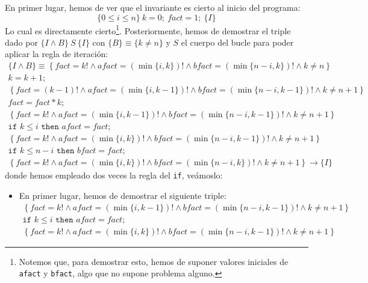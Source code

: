 \begin{ejercicio}
    En primer lugar, hemos de ver que el invariante es cierto al inicio del programa:
    \begin{equation*}
        \{0\leq i\leq n\}\ k=0;\ fact=1;\ \{I\}
    \end{equation*}
    Lo cual es directamente cierto\footnote{Notemos que, para demostrar esto, hemos de suponer valores iniciales de \texttt{afact} y \texttt{bfact}, algo que no supone problema alguno.}. Posteriormente, hemos de demostrar el triple dado por $\{I \land B\}\ S\ \{I\}$ con $\{B\} \equiv \{k \neq n\}$ y $S$ el cuerpo del bucle para poder aplicar la regla de iteración:
    \begin{gather*}
        \{I \land B\} \equiv \left\{fact = k! \land afact = (\min\{i,k\})! \land bfact = (\min\{n-i,k\})! \land k \neq n\right\} \\
        k = k + 1; \\
        \left\{fact = (k-1)! \land afact = (\min\{i,k-1\})! \land bfact = (\min\{n-i,k-1\})! \land k \neq n+1\right\} \\
        fact = fact * k; \\
        \left\{fact = k! \land afact = (\min\{i,k-1\})! \land bfact = (\min\{n-i,k-1\})! \land k \neq n+1\right\} \\
        \texttt{if\ } k \leq i \texttt{\ then\ } afact = fact; \\
        \left\{fact = k! \land afact = (\min\{i,k\})! \land bfact = (\min\{n-i,k-1\})! \land k \neq n+1\right\} \\
        \texttt{if\ } k \leq n-i \texttt{\ then\ } bfact = fact; \\
        \left\{fact = k! \land afact = (\min\{i,k\})! \land bfact = (\min\{n-i,k\})! \land k \neq n+1\right\} \rightarrow \{I\}
    \end{gather*}
    donde hemos empleado dos veces la regla del \texttt{if}, veámoslo:
    \begin{itemize}
        \item En primer lugar, hemos de demostrar el siguiente triple:
        \begin{gather*}
            \left\{fact = k! \land afact = (\min\{i,k-1\})! \land bfact = (\min\{n-i,k-1\})! \land k \neq n+1\right\} \\
            \texttt{if\ } k \leq i \texttt{\ then\ } afact = fact; \\
            \left\{fact = k! \land afact = (\min\{i,k\})! \land bfact = (\min\{n-i,k-1\})! \land k \neq n+1\right\}
        \end{gather*}


\end{itemize}
\end{ejercicio}
